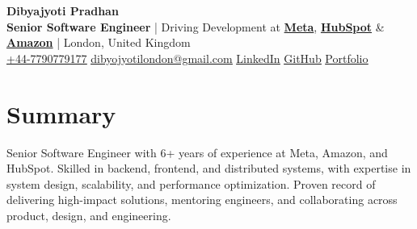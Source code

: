 \documentclass[a4paper,10pt]{article}
\begin{document}
\begin{center}
    {\fontsize{36}{20}\selectfont\textbf{Dibyajyoti Pradhan}}\\[0.4em]
    {\small \textbf{Senior Software Engineer} | Driving Development at
    \textbf{\textcolor{primarycolor}{\href{https://en.wikipedia.org/wiki/Meta_Platforms}{Meta}}},
    \textbf{\textcolor{primarycolor}{\href{https://en.wikipedia.org/wiki/HubSpot}{HubSpot}}} \&
    \textbf{\textcolor{primarycolor}{\href{https://en.wikipedia.org/wiki/Amazon_(company)}{Amazon}}}} |
    London, United Kingdom\\[0.4em]
    \href{tel:+447790779177}{\uline{+44-7790779177}} \quad
    \href{mailto:dibyojyotilondon@gmail.com}{\uline{dibyojyotilondon@gmail.com}} \quad
    \href{https://www.linkedin.com/in/dibyajyoti-pradhan-83a649146/}{\uline{LinkedIn}} \quad
    \href{https://github.com/Dibyajyoti-Pradhan}{\uline{GitHub}} \quad
    \href{https://dibyajyoti-pradhan.github.io/my-portfolio/}{\uline{Portfolio}}
\end{center}

\section*{Summary}
Senior Software Engineer with 6+ years of experience at Meta, Amazon, and HubSpot. Skilled in backend, frontend, and distributed systems, with expertise in system design, scalability, and performance optimization. Proven record of delivering high-impact solutions, mentoring engineers, and collaborating across product, design, and engineering.

\vspace
\end{document}
